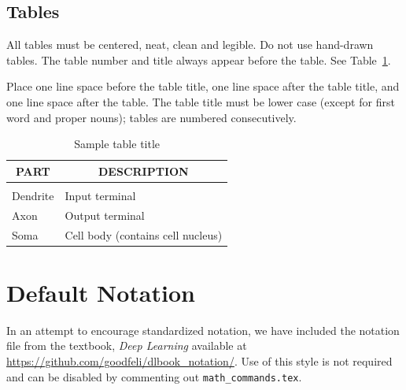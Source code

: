 \documentclass{article} %
\theoremstyle{plain}
\theoremstyle{definition}
\theoremstyle{remark}
\begin{document}
\subsection{Tables}

All tables must be centered, neat, clean and legible. Do not use hand-drawn
tables. The table number and title always appear before the table. See
Table~\ref{sample-table}.

Place one line space before the table title, one line space after the table
title, and one line space after the table. The table title must be lower case
(except for first word and proper nouns); tables are numbered consecutively.

\begin{table}[t]
\caption{Sample table title}
\label{sample-table}
\begin{center}
\begin{tabular}{ll}
\multicolumn{1}{c}{\bf PART}  &\multicolumn{1}{c}{\bf DESCRIPTION}
\\ \hline \\
Dendrite         &Input terminal \\
Axon             &Output terminal \\
Soma             &Cell body (contains cell nucleus) \\
\end{tabular}
\end{center}
\end{table}

\section{Default Notation}

In an attempt to encourage standardized notation, we have included the
notation file from the textbook, \textit{Deep Learning}
\cite{goodfellow2016deep} available at
\url{https://github.com/goodfeli/dlbook_notation/}.  Use of this style
is not required and can be disabled by commenting out
\texttt{math\_commands.tex}.
\end{document}
